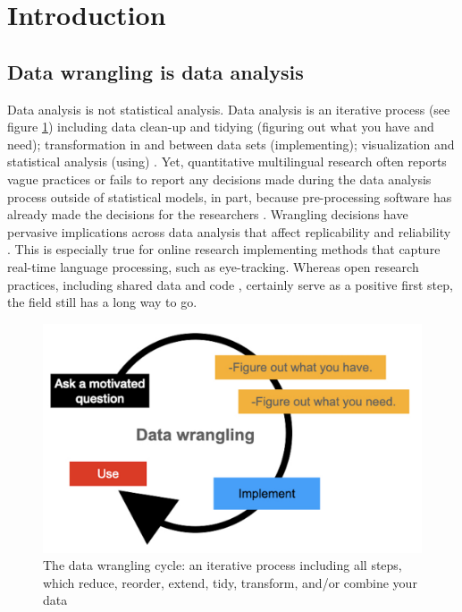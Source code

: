 \section{Introduction}
\subsection{Data wrangling is data analysis}

Data analysis is not statistical analysis. Data analysis is an iterative process (see figure \ref{fig:data_wrangling})  including data clean-up and tidying (figuring out what you have and need); transformation in and between data sets (implementing);  visualization and statistical analysis (using) \parencite{Wickham2017R}. Yet, quantitative multilingual research often reports vague practices or fails to report any decisions made during the data analysis process outside of statistical models, in part, because pre-processing software has already made the decisions for the researchers \parencite{Prystauka_Altmann_Rothman_2023}. Wrangling decisions have pervasive implications across data analysis that affect replicability and reliability \parencite{ana_flex}. This is especially true for online research implementing methods that capture real-time language processing, such as eye-tracking. Whereas open research practices, including shared data and code \parencite{Bolibaugh}, certainly serve as a positive first step, the field still has a long way to go. 

\begin{figure}[h]
    \centering
    \includegraphics[scale=.3]{figures/data_wrangling.png}
    \caption{The data wrangling cycle: an iterative process including all steps, which reduce, reorder, extend, tidy, transform, and/or combine your data}
    \label{fig:data_wrangling}
\end{figure}

